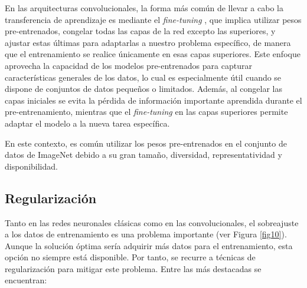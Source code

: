 En las arquitecturas convolucionales, la forma más común de llevar a cabo la transferencia de aprendizaje es mediante el \textit{fine-tuning} \cite{39}, que implica utilizar pesos pre-entrenados, congelar todas las capas de la red excepto las superiores, y ajustar estas últimas para adaptarlas a nuestro problema específico, de manera que el entrenamiento se realice únicamente en esas capas superiores. Este enfoque aprovecha la capacidad de los modelos pre-entrenados para capturar características generales de los datos, lo cual es especialmente útil cuando se dispone de conjuntos de datos pequeños o limitados. Además, al congelar las capas iniciales se evita la pérdida de información importante aprendida durante el pre-entrenamiento, mientras que el \textit{fine-tuning} en las capas superiores permite adaptar el modelo a la nueva tarea específica.

En este contexto, es común utilizar los pesos pre-entrenados en el conjunto de datos de ImageNet \cite{50} debido a su gran tamaño, diversidad, representatividad y disponibilidad.


\subsection{Regularización}
Tanto en las redes neuronales clásicas como en las convolucionales, el sobreajuste a los datos de entrenamiento es una problema importante (ver Figura \ref{fig10}). Aunque la solución óptima sería adquirir más datos para el entrenamiento, esta opción no siempre está disponible. Por tanto, se recurre a técnicas de regularización para mitigar este problema. Entre las más destacadas se encuentran:

